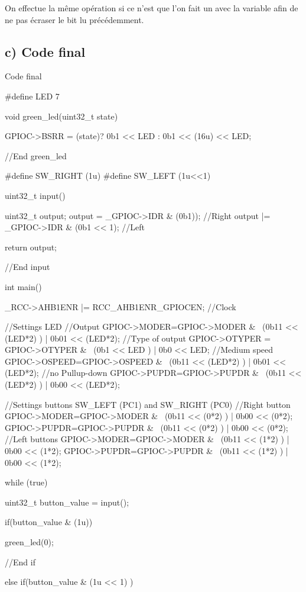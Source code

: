{On effectue la même opération si ce n'est que l'on fait un  avec la variable  afin de ne pas écraser le bit lu précédemment.


\subsection{c) Code final}


\begin{Cpp}{Code final}

  #define LED 7
  
  void green_led(uint32_t state){

    GPIOC->BSRR = (state)? 0b1 << LED : 0b1 << (16u) << LED;

  }//End green_led

  #define SW_RIGHT (1u)
  #define SW_LEFT (1u<<1)

  uint32_t input(){

    uint32_t output;
    output = _GPIOC->IDR & (0b1)); //Right
    output |= _GPIOC->IDR & (0b1 << 1); //Left
  
    return output;

  }//End input

  int main(){
  
    _RCC->AHB1ENR |= RCC_AHB1ENR_GPIOCEN; //Clock

    //Settings LED
    //Output
    GPIOC->MODER=GPIOC->MODER & ~(0b11 << (LED*2) ) | 0b01 << (LED*2); 
    //Type of output
    GPIOC->OTYPER = GPIOC->OTYPER & ~(0b1 << LED ) | 0b0 << LED; 
    //Medium speed
    GPIOC->OSPEED=GPIOC->OSPEED & ~(0b11 << (LED*2) ) | 0b01 << (LED*2);
    //no Pullup-down
    GPIOC->PUPDR=GPIOC->PUPDR & ~(0b11 << (LED*2) ) | 0b00 << (LED*2);


    //Settings buttons SW_LEFT (PC1) and SW_RIGHT (PC0)
    //Right button
    GPIOC->MODER=GPIOC->MODER & ~(0b11 << (0*2) ) | 0b00 << (0*2); 
    GPIOC->PUPDR=GPIOC->PUPDR & ~(0b11 << (0*2) ) | 0b00 << (0*2);
    //Left buttons
    GPIOC->MODER=GPIOC->MODER & ~(0b11 << (1*2) ) | 0b00 << (1*2); 
    GPIOC->PUPDR=GPIOC->PUPDR & ~(0b11 << (1*2) ) | 0b00 << (1*2);
  
    while (true){
  
      uint32_t button_value = input();
  
      if(button_value & (1u)){
  
        green_led(0);
  
      }//End if
  
      else if(button_value & (1u << 1) ){
      
}}}
\end{Cpp}}
